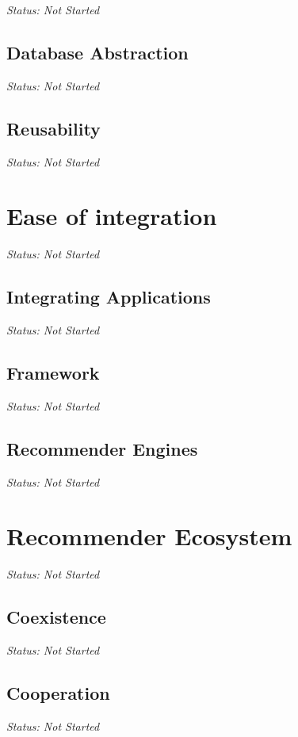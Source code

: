 \emph{Status: Not Started}

\subsection{Database Abstraction}

\emph{Status: Not Started}

\subsection{Reusability}

\emph{Status: Not Started}

\section{Ease of integration}

\emph{Status: Not Started}

\subsection{Integrating Applications}

\emph{Status: Not Started}

\subsection{Framework}

\emph{Status: Not Started}

\subsection{Recommender Engines}

\emph{Status: Not Started}

\section{Recommender Ecosystem}

\emph{Status: Not Started}

\subsection{Coexistence}

\emph{Status: Not Started}

\subsection{Cooperation}

\emph{Status: Not Started}